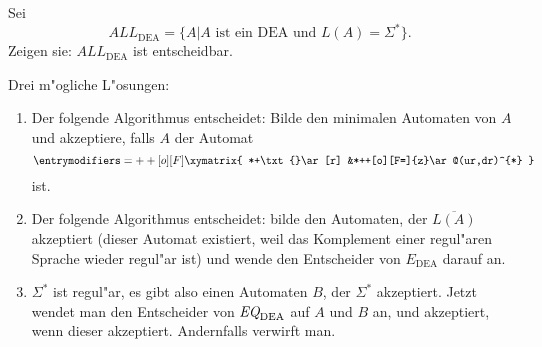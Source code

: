 Sei
\[
{ALL}_{\text{DEA}}=\{ A| \text{$A$ ist ein DEA und $L(A)=\Sigma^*$}\}.
\]
Zeigen sie:
$ALL_{\text{DEA}}$ ist entscheidbar.

\begin{loesung}
Drei m"ogliche L"osungen:
\begin{enumerate}
\item
Der folgende Algorithmus entscheidet: Bilde den minimalen Automaten von
$A$ und akzeptiere, falls $A$ der Automat
\[
\entrymodifiers={++[o][F]}
\xymatrix{
*+\txt{}\ar[r]
        &*++[o][F=]{z}\ar@(ur,dr)^{*}
}
\]
ist.
\item
Der folgende Algorithmus entscheidet: bilde den Automaten, der
$\overline{L(A)}$ akzeptiert (dieser Automat existiert, weil
das Komplement einer regul"aren Sprache wieder regul"ar ist)
und wende den Entscheider von $E_\text{DEA}$ darauf an.
\item
$\Sigma^*$ ist regul"ar, es gibt also einen Automaten $B$, der
$\Sigma^*$ akzeptiert. Jetzt wendet man den Entscheider von
$\text{\it EQ}_{\text{DEA}}$ auf $A$ und $B$ an, und akzeptiert,
wenn dieser akzeptiert. Andernfalls verwirft man.
\end{enumerate}
\end{loesung}
